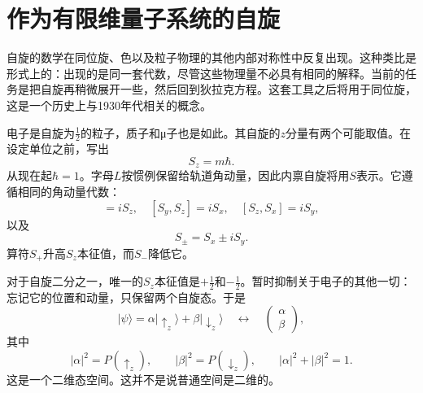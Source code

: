 \section{作为有限维量子系统的自旋}

自旋的数学在同位旋、色以及粒子物理的其他内部对称性中反复出现。这种类比是形式上的：出现的是同一套代数，尽管这些物理量不必具有相同的解释。当前的任务是把自旋再稍微展开一些，然后回到狄拉克方程。这套工具之后将用于同位旋，这是一个历史上与1930年代相关的概念。

电子是自旋为\(\tfrac12\)的粒子，质子和{\proseunicodefont μ}子也是如此。其自旋的\(z\)分量有两个可能取值。在设定单位之前，写出
\begin{equation}
S_z=m\hbar.
\end{equation}
从现在起\(\hbar=1\)。字母\(L\)按惯例保留给轨道角动量，因此内禀自旋将用\(S\)表示。它遵循相同的角动量代数：
\begin{equation}
[S_x,S_y]=iS_z,
\quad
[S_y,S_z]=iS_x,
\quad
[S_z,S_x]=iS_y,
\end{equation}
以及
\begin{equation}
S_\pm=S_x\pm iS_y.
\end{equation}
算符\(S_+\)升高\(S_z\)本征值，而\(S_-\)降低它。

\begin{classroomqa}
\end{classroomqa}

对于自旋二分之一，唯一的\(S_z\)本征值是\(+\tfrac12\)和\(-\tfrac12\)。暂时抑制关于电子的其他一切：忘记它的位置和动量，只保留两个自旋态。于是
\begin{equation}
|\psi\rangle
=
\alpha|\uparrow_z\rangle+\beta|\downarrow_z\rangle
\quad\longleftrightarrow\quad
\begin{pmatrix}
\alpha\\
\beta
\end{pmatrix},
\end{equation}
其中
\begin{equation}
|\alpha|^2=P(\uparrow_z),
\qquad
|\beta|^2=P(\downarrow_z),
\qquad
|\alpha|^2+|\beta|^2=1.
\end{equation}
这是一个二维态空间。这并不是说普通空间是二维的。

\begin{classroomqa}
\end{classroomqa}

